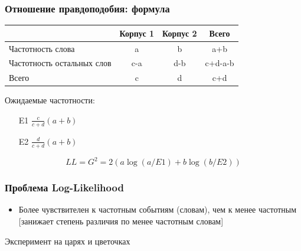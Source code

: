 \documentclass[svgnames]{beamer}
\begin{document}
\begin{frame}
  \frametitle{Отношение правдоподобия: формула}
  \begin{tabular}[c]{|p{}|c|c|c|}
    \hline
   & Корпус 1 & Корпус 2 & Всего \\
    \hline
    Частотность слова & a & b & a+b \\
    \hline
    Частотность остальных слов & c-a & d-b & c+d-a-b \\
    \hline
    Всего & c & d & c+d \\
    \hline
  \end{tabular}

\bigskip
  Ожидаемые частотности:
  \begin{itemize}
  \item[E1] $\frac{c}{c+d}(a+b)$
  \item[E2] $\frac{d}{c+d}(a+b)$
  \end{itemize}

  \begin{equation}
    LL = G^2 = 2 (a \log (a/E1) + b \log (b/E2) ) 
  \end{equation}
\end{frame}

\begin{frame}
  \frametitle{Проблема Log-Likelihood}
  \begin{itemize}
  \item Более чувствителен к частотным событиям (словам), чем к менее
    частотным [занижает степень различия по менее частотным словам]
  \end{itemize}
\end{frame}

\begin{frame}[standout]
  \alert{Эксперимент на царях и цветочках}
\end{frame}
\end{document}
